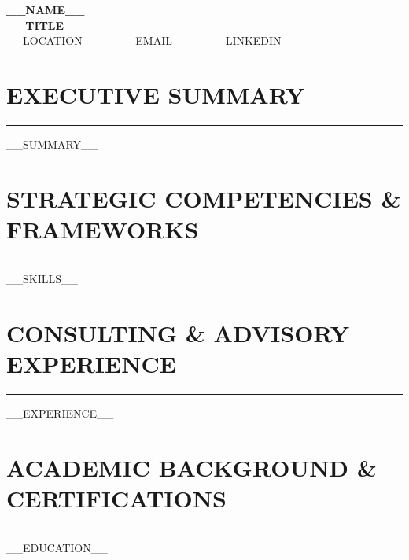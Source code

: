 \documentclass[10pt,letterpaper]{article}
\begin{document}
\begin{center}
    {\LARGE \textbf{\color{darkgray} __NAME__}} \\ \vspace{2pt}
    {\large \textbf{__TITLE__}} \\ \vspace{2pt}
    \small __LOCATION__ \ \textbar\ \ __EMAIL__ \ \textbar\ \ __LINKEDIN__
\end{center}

\vspace{-4pt}
\section*{\large\bfseries\color{primary}\uppercase{Executive Summary}}
\vspace{-4pt}\rule{\textwidth}{0.8pt}\vspace{3pt}
__SUMMARY__

\section*{\large\bfseries\color{primary}\uppercase{Strategic Competencies \& Frameworks}}
\vspace{-4pt}\rule{\textwidth}{0.8pt}\vspace{3pt}
\small
__SKILLS__

\section*{\large\bfseries\color{primary}\uppercase{Consulting \& Advisory Experience}}
\vspace{-4pt}\rule{\textwidth}{0.8pt}\vspace{3pt}
\small
__EXPERIENCE__

\section*{\large\bfseries\color{primary}\uppercase{Academic Background \& Certifications}}
\vspace{-4pt}\rule{\textwidth}{0.8pt}\vspace{3pt}
\small
__EDUCATION__
\end{document}
